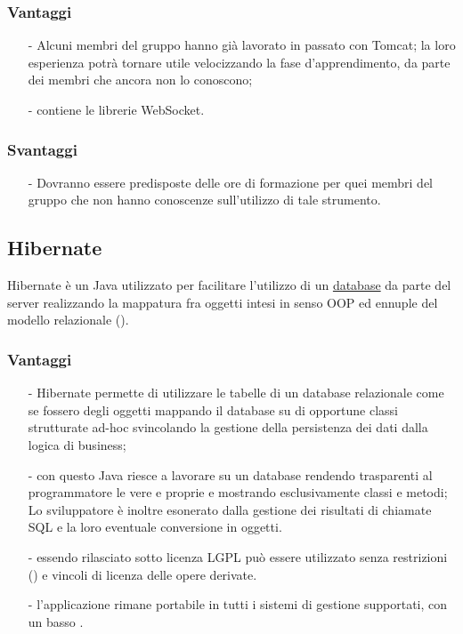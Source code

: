 \subsubsection*{Vantaggi}

\begin{itemize}[noitemsep,nolistsep]
  \item[-] Alcuni membri del gruppo hanno già lavorato in passato con Tomcat; la loro esperienza potrà tornare utile velocizzando la fase d'apprendimento, da parte dei membri che ancora non lo conoscono;
  \item[-] contiene le librerie WebSocket.
\end{itemize}

\subsubsection*{Svantaggi}
\begin{itemize}[noitemsep,nolistsep]
  \item[-] Dovranno essere predisposte delle ore di formazione per quei membri del gruppo che non hanno conoscenze sull'utilizzo di tale strumento.
\end{itemize}

\subsection{Hibernate}\label{sec:hibernate}

Hibernate è un  Java utilizzato per facilitare l'utilizzo di un \underline{database} da parte del server realizzando la mappatura fra oggetti intesi in senso OOP ed ennuple del modello relazionale ().

\subsubsection*{Vantaggi}
\begin{itemize}[noitemsep,nolistsep]
\item[-] Hibernate permette di utilizzare le tabelle di un database relazionale come se fossero degli oggetti mappando il database su di opportune classi strutturate ad-hoc svincolando la gestione della persistenza dei dati dalla logica di business;
\item[-] con questo  Java riesce a lavorare su un database rendendo trasparenti al programmatore le vere e proprie  e mostrando esclusivamente classi e metodi; Lo sviluppatore è inoltre esonerato dalla gestione dei risultati di chiamate SQL e la loro eventuale conversione in oggetti.
\item[-] essendo rilasciato sotto licenza LGPL può essere utilizzato senza restrizioni () e vincoli di licenza delle opere derivate.
\item[-] l'applicazione rimane portabile in tutti i sistemi di gestione supportati, con un basso .
\end{itemize}

